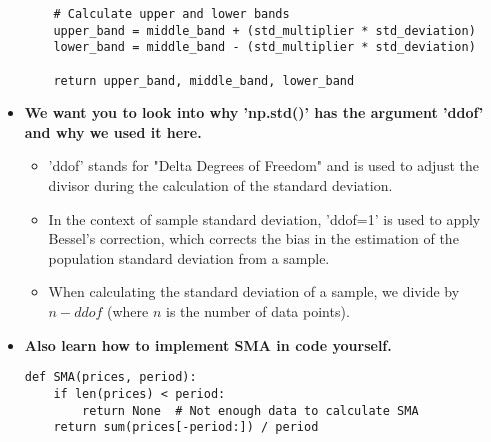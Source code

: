 \documentclass{article}
\begin{document}
\begin{itemize}
\begin{lstlisting}
    # Calculate upper and lower bands
    upper_band = middle_band + (std_multiplier * std_deviation)
    lower_band = middle_band - (std_multiplier * std_deviation)
    
    return upper_band, middle_band, lower_band
    \end{lstlisting}
    \item \textbf{We want you to look into why 'np.std()' has the argument 'ddof' and why we used it here.}
    \begin{itemize}
        \item 'ddof' stands for "Delta Degrees of Freedom" and is used to adjust the divisor during the calculation of the standard deviation.
        \item In the context of sample standard deviation, 'ddof=1' is used to apply Bessel's correction, which corrects the bias in the estimation of the population standard deviation from a sample.
        \item When calculating the standard deviation of a sample, we divide by \( n - ddof \) (where \( n \) is the number of data points).
        \end{itemize}
    \item \textbf{Also learn how to implement SMA in code yourself.}
    \begin{lstlisting}
def SMA(prices, period):
    if len(prices) < period:
        return None  # Not enough data to calculate SMA
    return sum(prices[-period:]) / period
    \end{lstlisting}
\end{itemize}
\end{document}
